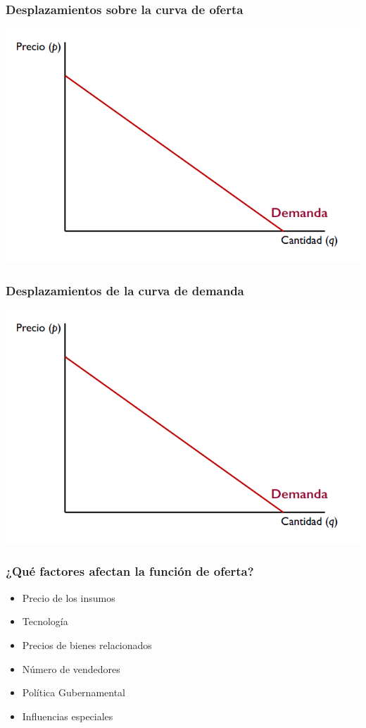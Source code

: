 \documentclass{beamer}
\begin{document}
\begin{frame}
\frametitle{Desplazamientos sobre la curva de oferta}
\includegraphics[scale=0.6]{Slides Principios de Economia/Figures/Tema_07.1_curvadeldemanda.png}
\end{frame}

\begin{frame}
\frametitle{Desplazamientos de la curva de demanda}
\includegraphics[scale=0.6]{Slides Principios de Economia/Figures/Tema_07.1_curvadeldemanda.png}
\end{frame}

\begin{frame}
\frametitle{¿Qué factores afectan la función de oferta?}
\begin{itemize}
    \item Precio de los insumos %
    \item Tecnología %
    \item Precios de bienes relacionados %
    \item Número de vendedores %
    \item Política Gubernamental %
    \item Influencias especiales %
\end{itemize}
\end{frame}
\end{document}
